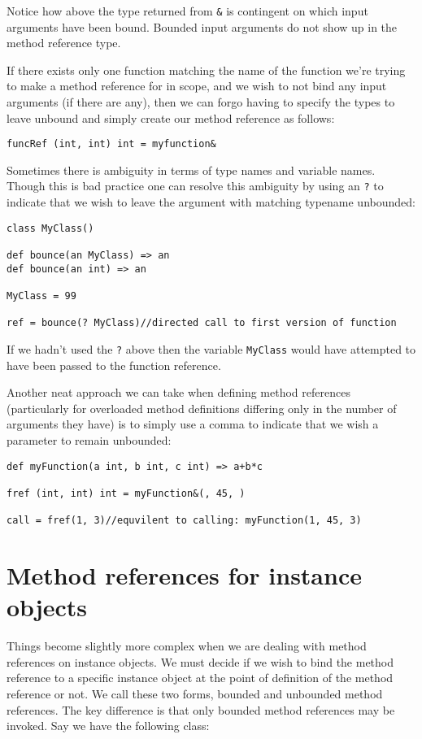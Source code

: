 \documentclass[conc-doc]{subfiles}
\begin{document}
Notice how above the type returned from \lstinline{&} is contingent on which input arguments have been bound. Bounded input arguments do not show up in the method reference type.

If there exists only one function matching the name of the function we're trying to make a method reference for in scope, and we wish to not bind any input arguments (if there are any), then we can forgo having to specify the types to leave unbound and simply create our method reference as follows:

\begin{lstlisting}
funcRef (int, int) int = myfunction&
\end{lstlisting}

Sometimes there is ambiguity in terms of type names and variable names. Though this is bad practice one can resolve this ambiguity by using an \lstinline{?} to indicate that we wish to leave the argument with matching typename unbounded:

\begin{lstlisting}
class MyClass()

def bounce(an MyClass) => an
def bounce(an int) => an

MyClass = 99

ref = bounce(? MyClass)//directed call to first version of function
\end{lstlisting}

If we hadn't used the \lstinline{?} above then the variable \lstinline{MyClass} would have attempted to have been passed to the function reference.

Another neat approach we can take when defining method references (particularly for overloaded method definitions differing only in the number of arguments they have) is to simply use a comma to indicate that we wish a parameter to remain unbounded:

\begin{lstlisting}
def myFunction(a int, b int, c int) => a+b*c

fref (int, int) int = myFunction&(, 45, )

call = fref(1, 3)//equvilent to calling: myFunction(1, 45, 3)
\end{lstlisting}

\section{Method references for instance objects}
Things become slightly more complex when we are dealing with method references on instance objects. We must decide if we wish to bind the method reference to a specific instance object at the point of definition of the method reference or not. We call these two forms, bounded and unbounded method references. The key difference is that only bounded method references may be invoked. Say we have the following class:
\end{document}
